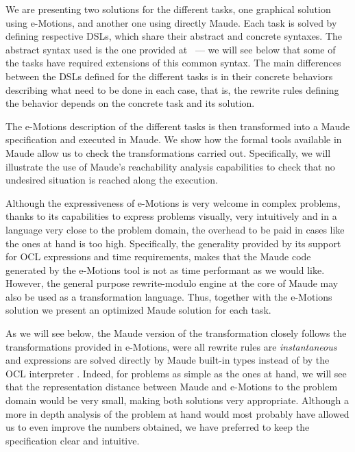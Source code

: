 
We are presenting two solutions for the different tasks, one graphical solution using e-Motions, and another one using directly Maude. Each task is solved by defining respective DSLs, which share their abstract and concrete syntaxes. The abstract syntax used is the one provided at~\cite{imdbsources} --- we will see below that some of the tasks have required extensions of this common syntax. The main differences between the DSLs defined for the different tasks is in their  concrete behaviors describing what need to be done in each case, that is, the rewrite rules defining the behavior depends on the concrete task and its solution. 

The e-Motions description of the different tasks is then transformed into a Maude specification and executed in Maude. We show how the formal tools available in Maude allow us to check the transformations carried out. Specifically, we will illustrate the use of Maude's reachability analysis capabilities to check that no undesired situation is reached along the execution. 

Although the expressiveness of e-Motions is very welcome in complex problems, thanks to its capabilities to express problems visually, very intuitively and in a language very close to the problem domain, the overhead to be paid in cases like the ones at hand is too high. Specifically, the generality provided by its support for OCL expressions and time requirements, makes that the Maude code generated by the e-Motions tool is not as time performant as we would like. However, the general purpose rewrite-modulo engine at the core of Maude may also be used as a transformation language. Thus, together with the e-Motions solution we present an optimized Maude solution for each task.  

As we will see below, the Maude version of the transformation closely follows the transformations provided in e-Motions, were all rewrite rules are \textit{instantaneous} and expressions are solved directly by Maude built-in types instead of by the OCL interpreter \cite{Roldan-Duran:2008-tr}. Indeed, for problems as simple as the ones at hand, we will see that the representation distance between Maude and e-Motions to the problem domain would be very small, making both solutions very appropriate. Although a more in depth analysis of the problem at hand would most probably have allowed us to even improve the numbers obtained, we have preferred to keep the specification clear and intuitive.

